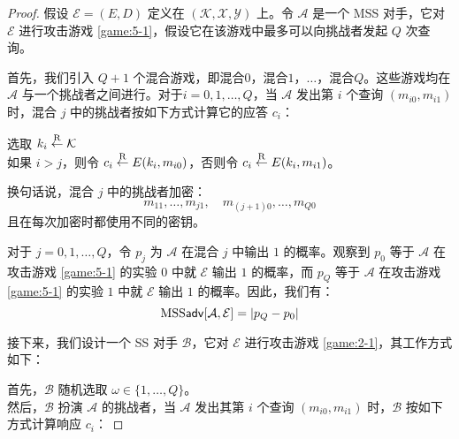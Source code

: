 \begin{proof}
假设 $\mathcal{E}=(E,D)$ 定义在 $(\mathcal{K},\mathcal{X},\mathcal{Y})$ 上。令 $\mathcal{A}$ 是一个 MSS 对手，它对 $\mathcal{E}$ 进行攻击游戏 \ref{game:5-1}，假设它在该游戏中最多可以向挑战者发起 $Q$ 次查询。

首先，我们引入 $Q+1$ 个混合游戏，即混合$0$，混合$1$，$\dots$，混合$Q$。这些游戏均在 $\mathcal{A}$ 与一个挑战者之间进行。对于$i=0,1,\dots,Q$，当 $\mathcal{A}$ 发出第 $i$ 个查询 $(m_{i0},m_{i1})$ 时，混合 $j$ 中的挑战者按如下方式计算它的应答 $c_i$：

\vspace{5pt}

\hspace*{5pt} 选取 $k_i\overset{\rm R}\leftarrow\mathcal{K}$\\
\hspace*{26pt} 如果 $i>j$，则令 $c_i\overset{\rm R}\leftarrow E(k_i,m_{i0})$，否则令 $c_i\overset{\rm R}\leftarrow E(k_i,m_{i1})$。

\vspace{5pt}

\noindent
换句话说，混合 $j$ 中的挑战者加密：
\[
m_{11},\dots,m_{j1},
\quad
m_{(j+1)0},\dots,m_{Q0}
\]
且在每次加密时都使用不同的密钥。

对于 $j=0,1,\dots,Q$，令 $p_j$ 为 $\mathcal{A}$ 在混合 $j$ 中输出 $1$ 的概率。观察到 $p_0$ 等于 $\mathcal{A}$ 在攻击游戏 \ref{game:5-1} 的实验 $0$ 中就 $\mathcal{E}$ 输出 $1$ 的概率，而 $p_Q$ 等于 $\mathcal{A}$ 在攻击游戏 \ref{game:5-1} 的实验 $1$ 中就 $\mathcal{E}$ 输出 $1$ 的概率。因此，我们有：
\begin{equation}\label{eq:5-2}
{\rm MSS}\mathsf{adv}[\mathcal{A},\mathcal{E}]=|p_Q-p_0|
\end{equation}

接下来，我们设计一个 SS 对手 $\mathcal{B}$，它对 $\mathcal{E}$ 进行攻击游戏 \ref{game:2-1}，其工作方式如下：

\vspace{5pt}

\hspace*{5pt} 首先，$\mathcal{B}$ 随机选取 $\omega\in\{1,\dots,Q\}$。\\
\hspace*{26pt} 然后，$\mathcal{B}$ 扮演 $\mathcal{A}$ 的挑战者，当 $\mathcal{A}$ 发出其第 $i$ 个查询 $(m_{i0},m_{i1})$ 时，$\mathcal{B}$ 按如下方式计算响应 $c_i$：

\vspace{5pt}



\end{proof}
